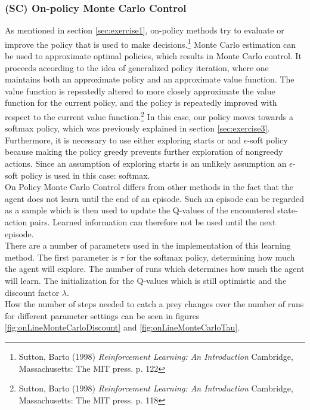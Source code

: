 \documentclass{article}
\begin{document}
\subsubsection{(SC) On-policy Monte Carlo Control}\label{sec:exercise4.1}
As mentioned in section \ref{sec:exercise1}, on-policy methods try to evaluate or improve the policy that is used to make decisions.\footnote{Sutton, Barto (1998) \textit{Reinforcement Learning: An Introduction} Cambridge, Massachusetts: The MIT press. p. 122} Monte Carlo estimation can be used to approximate optimal policies, which results in Monte Carlo control. It proceeds according to the idea of generalized policy iteration, where one maintains both an approximate policy and an approximate value function. The value function is repeatedly altered to more closely approximate the value function for the current policy, and the policy is repeatedly improved with respect to the current value function.\footnote{Sutton, Barto (1998) \textit{Reinforcement Learning: An Introduction} Cambridge, Massachusetts: The MIT press. p. 118} In this case, our policy moves towards a softmax policy, which was previously explained in section \ref{sec:exercise3}. Furthermore, it is necessary to use either exploring starts or and $\epsilon$-soft policy because making the policy greedy prevents further exploration of nongreedy actions. Since an assumption of exploring starts is an unlikely assumption an $\epsilon$-soft policy is used in this case: softmax.\\ 

On Policy Monte Carlo Control differs from other methods in the fact that the agent does not learn until the end of an episode. Such an episode can be regarded as a sample which is then used to update the Q-values of the encountered state-action pairs. Learned information can therefore not be used until the next episode.\\ 

There are a number of parameters used in the implementation of this learning method. The first parameter is $\tau$ for the softmax policy, determining how much the agent will explore. The number of runs which determines how much the agent will learn. The initialization for the Q-values which is still optimistic and the discount factor $\lambda$.\\  

How the number of steps needed to catch a prey changes over the number of runs for different parameter settings can be seen in figures \ref{fig:onLineMonteCarloDiscount} and \ref{fig:onLineMonteCarloTau}. 
\end{document}

